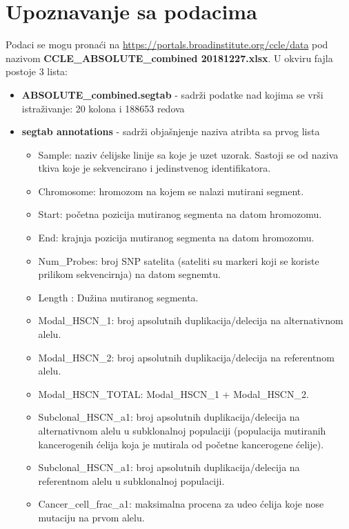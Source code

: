 \documentclass[a4paper]{article}
\begin{document}
\newpage

\section{Upoznavanje sa podacima}
\label{sec:Upoznavanje}

Podaci se mogu pronaći na \url{https://portals.broadinstitute.org/ccle/data} pod nazivom \textbf{CCLE\_ABSOLUTE\_combined 20181227.xlsx}. U okviru fajla postoje 3 lista:
\begin{itemize}
    \item \textbf{ABSOLUTE\_combined.segtab} - sadrži podatke nad kojima se vrši istraživanje: 20 kolona i 188653 redova
    \item \textbf{segtab annotations} - sadrži objašnjenje naziva atribta sa prvog lista
    \begin{itemize}
        \item Sample: naziv ćelijske linije sa koje je uzet uzorak. Sastoji se od naziva tkiva koje je sekvencirano i jedinstvenog identifikatora.
        \item Chromosome: hromozom na kojem se nalazi mutirani segment.
        \item Start: početna pozicija mutiranog segmenta na datom hromozomu.
        \item End: krajnja pozicija mutiranog segmenta na datom hromozomu.
        \item Num\_Probes: broj SNP satelita (sateliti su markeri koji se koriste prilikom sekvencirnja) na datom segnemtu\cite{SNP}.
        \item Length : Dužina mutiranog segmenta.
        \item Modal\_HSCN\_1: broj apsolutnih duplikacija/delecija na alternativnom alelu.
        \item Modal\_HSCN\_2: broj apsolutnih duplikacija/delecija na referentnom alelu.
        \item Modal\_HSCN\_TOTAL:  Modal\_HSCN\_1 +  Modal\_HSCN\_2. 
        \item Subclonal\_HSCN\_a1: broj apsolutnih duplikacija/delecija na alternativnom alelu u subklonalnoj populaciji (populacija mutiranih kancerogenih ćelija koja je mutirala od početne kancerogene ćelije)\cite{subclonal}.
        \item Subclonal\_HSCN\_a1: broj apsolutnih duplikacija/delecija na referentnom alelu u subklonalnoj populaciji.
        \item Cancer\_cell\_frac\_a1: maksimalna procena za udeo ćelija koje nose mutaciju na prvom alelu.

\end{itemize}
\end{itemize}
\end{document}
